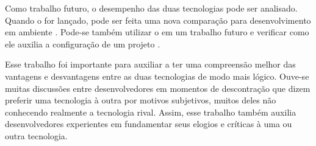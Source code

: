 Como trabalho futuro, o desempenho das duas tecnologias pode ser analisado. Quando o  for lançado, pode ser feita uma nova comparação para desenvolvimento em ambiente . Pode-se também utilizar o  em um trabalho futuro e verificar como ele auxilia a configuração de um projeto .

Esse trabalho foi importante para auxiliar a ter uma compreensão melhor das vantagens e desvantagens entre as duas tecnologias de modo mais lógico. Ouve-se muitas discussões entre desenvolvedores em momentos de descontração que dizem preferir uma tecnologia à outra por motivos subjetivos, muitos deles não conhecendo realmente a tecnologia rival. Assim, esse trabalho também auxilia desenvolvedores experientes em fundamentar seus elogios e críticas à uma ou outra tecnologia.





